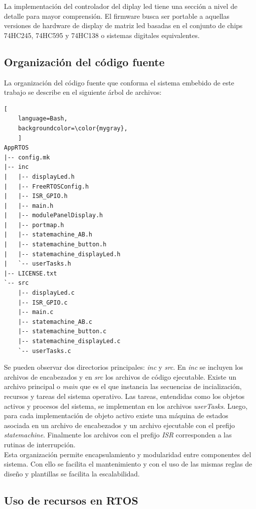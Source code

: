 La implementación del controlador del diplay led tiene una sección a nivel de detalle para mayor comprensión. El firmware busca ser portable a aquellas versiones de hardware de display de matriz led basadas en el conjunto de chips 74HC245, 74HC595 y 74HC138 o sistemas digitales equivalentes. \\



\subsection{Organización del código fuente}
La organización del código fuente que conforma el sistema embebido de este trabajo se describe en el siguiente árbol de archivos:

\begin{lstlisting}[
	language=Bash, 
	backgroundcolor=\color{mygray},
	]
AppRTOS
|-- config.mk
|-- inc
|   |-- displayLed.h
|   |-- FreeRTOSConfig.h
|   |-- ISR_GPIO.h
|   |-- main.h
|   |-- modulePanelDisplay.h
|   |-- portmap.h
|   |-- statemachine_AB.h
|   |-- statemachine_button.h
|   |-- statemachine_displayLed.h
|   `-- userTasks.h
|-- LICENSE.txt
`-- src
    |-- displayLed.c
    |-- ISR_GPIO.c
    |-- main.c
    |-- statemachine_AB.c
    |-- statemachine_button.c
    |-- statemachine_displayLed.c
    `-- userTasks.c
\end{lstlisting}

Se pueden observar dos directorios principales: \textit{inc} y \textit{src}. En \textit{inc} se incluyen los archivos de encabezados y en \textit{src} los archivos de código ejecutable. Existe un archivo principal o \textit{main} que es el que instancia las secuencias de incialización, recursos y tareas del sistema operativo. Las tareas, entendidas como los objetos activos y procesos del sistema, se implementan en los archivos \textit{userTasks}. Luego, para cada implementación de objeto activo existe una máquina de estados asociada en un archivo de encabezados y un archivo ejecutable con el prefijo \textit{statemachine}. Finalmente los archivos con el prefijo \textit{ISR} corresponden a las rutinas de interrupción.\\

Esta organización permite encapsulamiento y modularidad entre componentes del sistema. Con ello se facilita el mantenimiento y con el uso de las mismas reglas de diseño y plantillas se facilita la escalabilidad.\\

\subsection{Uso de recursos en RTOS}

